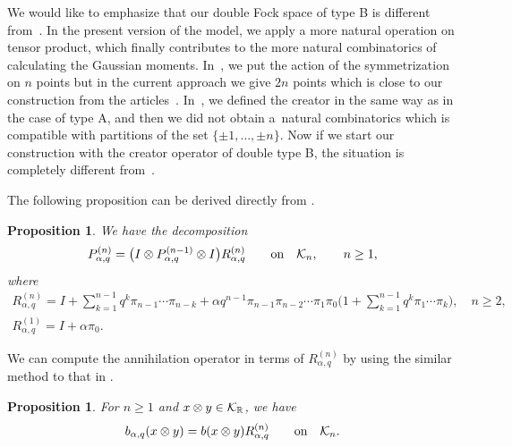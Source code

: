 \documentclass[11pt]{article}
\numberwithin{equation}{section}
\numberwithin{equation}{section}
\newtheorem{Proposition}[Theorem]{Proposition}
 { \theoremstyle{definition}
\newtheorem{Definition}[Theorem]{Definition}
\newtheorem{Note}[Theorem]{Note}
\newtheorem{Example}[Theorem]{Example}
\newtheorem{Remark}[Theorem]{Remark} }
\def\R{{\mathbb R}}
\def\B{b_{\s,\q}}
\def\r{b}
\def\id{I}
\def\H{{\bf \mathcal K}_{ n}}
\def\HH{{\bf \mathcal K}}
\newcommand{\q}{q}
\newcommand{\s}{\alpha}%
\begin{document}
\begin{Remark}
We would like to emphasize that our double Fock space of type B is different from~\cite{BozejkoEjsmontHasebe2015}.
	In the present version of the model, we apply a more natural operation on tensor product, which finally contributes to the more natural combinatorics of calculating the Gaussian moments.
	In~\cite{BozejkoEjsmontHasebe2015}, we put the action of the symmetrization on $n$ points but in the current ap\-proach we give $2n$ points which is close to our construction from the articles~\cite{BDEG2021,Ejsmont2020}. In~\cite{BozejkoEjsmontHasebe2015}, we defined the creator in the same way as in the case of type A, and then we did not obtain a~natural combinatorics which is compatible with partitions of the set $\{\pm 1,\dots, \pm n\}$.
	Now if we start our construction with the creator operator of double type B, the situation is completely different from~\cite{BozejkoEjsmontHasebe2015}.
\end{Remark}
The following proposition can be derived directly
from \cite[Proposition 2.3]{BozejkoEjsmontHasebe2015}.

\begin{Proposition}%
We have the decomposition
\begin{equation*}%
P^{(n)}_{\s,\q}=\big( \id \otimes P^{(n-1)}_{\s,\q}\otimes \id \big)R^{(n)}_{\s,\q}\qquad \text{on}\quad \H, \qquad n\geq 1,
\end{equation*}
where\vspace{-2mm}
\begin{gather*}
R^{(n)}_{\s,\q} = \id+\sum_{k=1}^{n-1}\q^{k}\pi_{n-1}\cdots \pi_{n-k} + \s \q^{n-1}\pi_{n-1} \pi_{n-2} \cdots \pi_{1}\pi_0\bigg(1+\sum_{k=1}^{n-1}\q^{k}\pi_{1}\cdots \pi_{k}\bigg), \quad n\geq 2,
\\
R^{(1)}_{\s,\q} =\id+\s\pi_0.%
\end{gather*}
\end{Proposition}

We can compute the annihilation operator in terms of $R_{\s,\q}^{(n)}$ by using the similar
method to that in \cite[Proposition~2.4]{BozejkoEjsmontHasebe2015}.

\begin{Proposition}%
For $n \geq1$ and $x\otimes y\in \HH_\R$, we have\vspace{-1mm}
\begin{equation*}
\B(x\otimes y)=\r(x\otimes y) R^{(n)}_{\s,\q}\qquad \text{on}\quad \H.
\end{equation*}
\end{Proposition}
\end{document}
